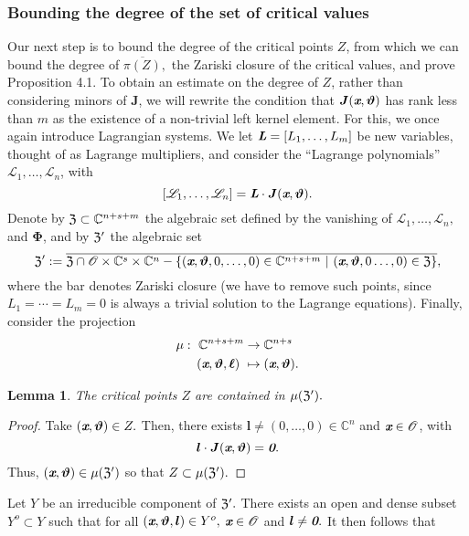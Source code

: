 \documentclass[a4paper]{article}
\def\sO{\mathscr{O}}
\def\bz{\textit{\textbf{0}}}
\def\thetab{\bm{\vartheta}}
\def\lb{{\bm l}}
\def\xb{\textit{\textbf{x}}}
\def\vt{\vartheta}
\def\dt{s}
\def\C{\mathbb{C}}
\newtheorem{lemma}[theorem]{Lemma}
\begin{document}
    \subsubsection{Bounding the degree of the set of critical values}
    Our next step is to bound the degree of the critical points $Z$, from which we can bound the degree of $\overline{\pi(Z)},$ the Zariski closure of the critical values, and prove Proposition 4.1. To obtain an estimate on the degree of $Z$, rather than
    considering minors of $\bm J$, we will rewrite the condition that $\bm
    J(\xb,\thetab)$ has rank less than $m$ as the existence of a
    non-trivial left kernel element. For this, we once again introduce Lagrangian systems. We let $\textit{\textbf{L}}=[L_1,\hdots,L_m]$ be new
    variables, thought of as Lagrange multipliers, and consider the
    ``Lagrange polynomials'' $\mathscr{L}_1,\dots,\mathscr{L}_{n}$, with
    \[
    [\mathscr{L}_1 ,\dots, \mathscr{L}_{n}]=\textit{\textbf{L}}\cdot \bm J(\xb,\thetab).
    \] 
    Denote by $\frak{Z} \subset \C^{n+\dt+m}$ the algebraic set defined by
    the vanishing of $\mathscr{L}_1,\hdots,\mathscr{L}_{n},$ and
    $\bm\Phi$, and by $\frak{Z}'$ the algebraic set
    \[
    \frak{Z}' := \overline{\frak{Z} \cap \sO \times \C^s \times \C^n - \{(\xb,\thetab,0,\hdots,0) \in \C^{n+\dt+m}~|~(\xb,\thetab,0\hdots,0) \in \frak{Z}\}},
    \]
    where the bar denotes Zariski closure (we have to remove such points,
    since $L_1=\cdots=L_m=0$ is always a trivial solution to the Lagrange
    equations). Finally, consider the projection
    \begin{align*} 
    \mu :~ \C^{n+\dt+m} &\rightarrow \C^{n+\dt}\\
    (\xb,\thetab,\bm \ell)~ &\mapsto (\xb,\thetab).
    \end{align*}
    \noindent 
    \begin{lemma}
    The critical points $Z$ are contained in $\mu(\frak{Z}').$
    \end{lemma}
    \begin{proof}
    Take $(\xb,\bm \vt) \in Z.$ Then, there exists $\lb \not = (0,\hdots,0) \in \C^n$ and $\xb \in \sO$, with 
    \[
    \lb \cdot \bm J(\xb,\thetab) = \bz.
    \]
    Thus, $(\xb,\bm \vt) \in \mu(\frak{Z}')$ so that $Z \subset \mu(\frak{Z}').$
    \end{proof}
    \noindent
    Let $Y$ be an irreducible component of $\frak{Z}'.$ There exists an open and dense subset $Y^o \subset Y$ such that for all $(\xb,\bm \vt,\lb) \in Y^o,$ $\xb \in \sO$ and $\lb \not = \bz.$ It then follows that 
\end{document}
